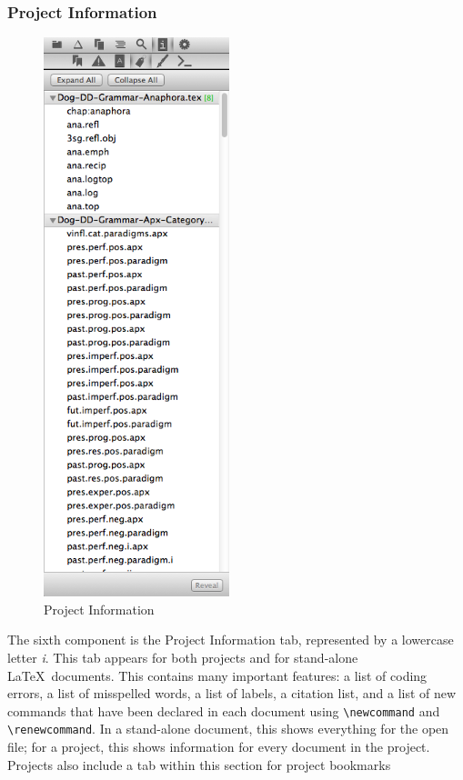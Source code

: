\pagebreak\clearpage
\subsubsection{Project Information}
\begin{figure}
\includegraphics[width=0.48\textwidth, trim = 0 8.5in 0 0, clip = true]{TeXnicle-Images/texnicle-nav-info.png}
\caption{Project Information}
\label{fig:texnicle-nav-info}
\end{figure}
The sixth component is the Project Information tab, represented by a lowercase letter \textsl{i}. This tab appears for both projects and for stand-alone \LaTeX\ documents. This contains many important features: a list of coding errors, a list of misspelled words, a list of labels, a citation list, and a list of new commands that have been declared in each document using \verb|\newcommand| and \verb|\renewcommand|. In a stand-alone document, this shows everything for the open file; for a project, this shows information for every document in the project. Projects also include a tab within this section for project bookmarks

